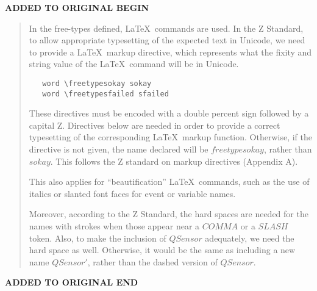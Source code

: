 \documentclass{report}
\renewcommand{\freetype}[1]{\mathsf{#1}}
\newcommand{\freetypesfailed}{\freetype{sfailed}}
\newcommand{\freetypesokay}{\freetype{sokay}}
\newenvironment{addedstuff}{\begin{flushleft}\textbf{ADDED TO ORIGINAL BEGIN}\begin{quote}\begin{minipage}{.8\textwidth}}{\end{minipage}\end{quote}\textbf{ADDED TO ORIGINAL END}\end{flushleft}}
\begin{document}
\begin{addedstuff}
In the free-types defined, \LaTeX\ commands are used. In the Z Standard,
to allow appropriate typesetting of the expected text in Unicode, we need
to provide a \LaTeX\ markup directive, which represents what the fixity
and string value of the \LaTeX\ command will be in Unicode.
%
\begin{verbatim}
   word \freetypesokay sokay
   word \freetypesfailed sfailed
\end{verbatim}
%
These directives must be encoded with a double percent sign followed by
a capital Z. Directives below are needed in order to provide a correct
typesetting of the corresponding \LaTeX\ markup function.
Otherwise, if the directive is not given, the name declared will be $freetypesokay$, rather than $sokay$. This follows
the Z standard on markup directives (Appendix A).

This also applies for ``beautification'' \LaTeX\ commands, such as
the use of italics or slanted font faces for event or variable names.

Moreover, according to the Z Standard, the hard spaces are needed for the names
with strokes when those appear near a $COMMA$ or a $SLASH$ token. Also,
to make the inclusion of $QSensor$ adequately, we need the hard space as well.
Otherwise, it would be the same as including a new name $QSensor'$, rather than
the dashed version of $QSensor$.
\end{addedstuff}
\end{document}
